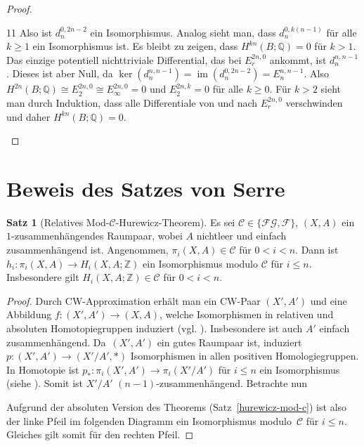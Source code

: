 \documentclass[11pt, a4paper, german]{article}
\theoremstyle{definition}
\newtheorem{satz}[lem]{Satz}
\theoremstyle{remark}
\newcommand{\Z}{\mathbb{Z}} %
\newcommand{\Q}{\mathbb{Q}} %
\DeclareMathOperator{\im}{im} %
\newcommand{\SC}{\mathcal{C}} %
\newcommand{\FG}{\mathcal{FG}} %
\newcommand{\F}{\mathcal{F}} %
\begin{document}
\begin{proof}
\begin{cutout}{0}{0pt}{\dimexpr\linewidth-5.5cm\relax}{11}
    Also ist $d_n^{0,2n-2}$ ein Isomorphismus.
    Analog sieht man, dass $d_n^{0,k(n-1)}$ für alle $k \geq 1$ ein Isomorphismus ist.
    Es bleibt zu zeigen, dass $H^{kn}(B; \Q) = 0$ für $k > 1$.
    Das einzige potentiell nichttriviale Differential, das bei $E_r^{2n,0}$ ankommt, ist $d_n^{n,n-1}$.
    Dieses ist aber Null, da $\ker(d_n^{n,n-1}) = \im(d_n^{0,2n-2}) = E_n^{n,n-1}$.
    Also $H^{2n}(B; \Q) \cong E_2^{2n,0} \cong E_\infty^{2n,0} = 0$ und $E_2^{2n,k} = 0$ für alle $k \geq 0$.
    Für $k > 2$ sieht man durch Induktion, dass alle Differentiale von und nach $E_r^{2n,0}$ verschwinden und daher $H^{kn}(B; \Q) = 0$. \qedhere
  \end{cutout}
\end{proof}

\section{Beweis des Satzes von Serre}

\begin{satz}[Relatives Mod-$\SC$-Hurewicz-Theorem]\label{relative-hurewicz-mod-c}
  Es sei $\SC \in \{ \FG, \F \}$, $(X, A)$ ein $1$-zusammenhängendes Raumpaar, wobei $A$ nichtleer und einfach zusammenhängend ist.
  Angenommen, $\pi_i(X, A) \in \SC$ für $0 < i < n$.
  Dann ist $h_i : \pi_i(X, A) \to H_i(X, A; \Z)$ ein Isomorphismus modulo $\SC$ für $i \leq n$.
  Insbesondere gilt $H_i(X, A; \Z) \in \SC$ für $0 < i < n$.
\end{satz}

\begin{proof}
  Durch CW-Approximation erhält man ein CW-Paar $(X', A')$ und eine Abbildung $f : (X', A') \to (X, A)$, welche Isomorphismen in relativen und absoluten Homotopiegruppen induziert (vgl. \cite[\mbox{} Ex 4.14]{hatcher:at}).
  Insbesondere ist auch $A'$ einfach zusammenhängend.
  Da~$(X', A')$ ein gutes Raumpaar ist, induziert $p : (X', A') \to (X'/A', *)$ Isomorphismen in allen positiven Homologiegruppen.
  In Homotopie ist $p_* : \pi_i(X', A') \to \pi_i(X'/A')$ für $i \leq n$ ein Isomorphismus (siehe \cite[\mbox{} Prop 4.28]{hatcher:at}).
  Somit ist $X'/A'$ $(n {-} 1)$-zusammenhängend.
  Betrachte nun
  \begin{center}
  \end{center}
  Aufgrund der absoluten Version des Theorems (Satz~\ref{hurewicz-mod-c}) ist also der linke Pfeil im folgenden Diagramm ein Isomorphismus modulo~$\SC$ für $i \leq n$.
  Gleiches gilt somit für den rechten Pfeil.
\end{proof}
\end{document}
